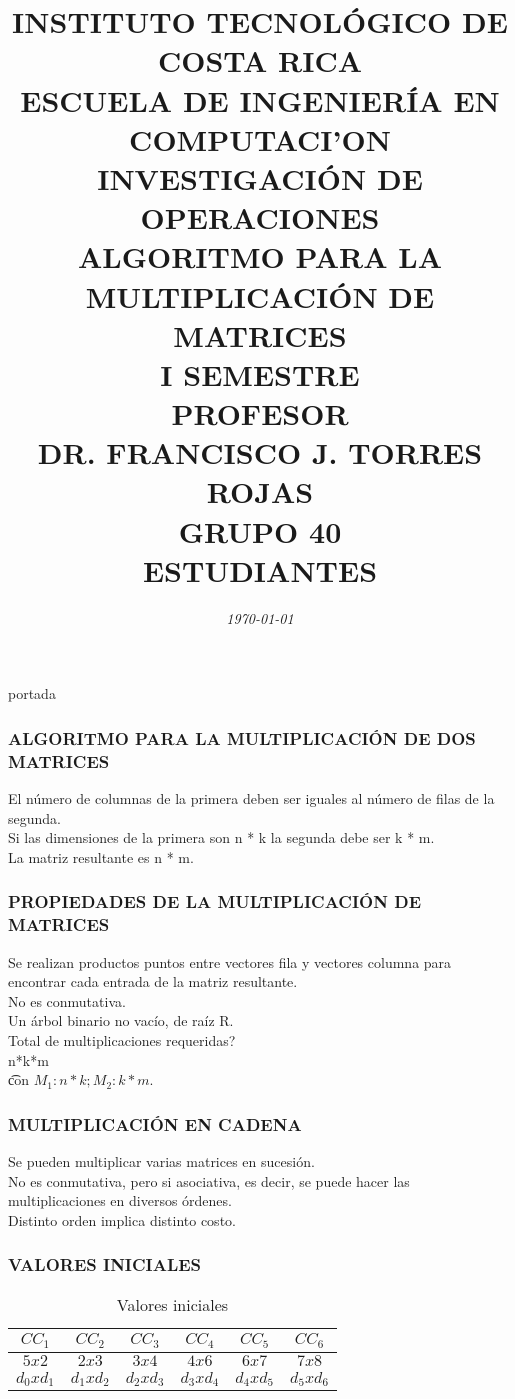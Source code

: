 \documentclass[10]{beamer}
\title{{\color{WHITE} \large \textbf{INSTITUTO TECNOL\'OGICO DE COSTA RICA}} \\ \vspace{0.02cm} 
{\color{WHITE} \large \textbf{ESCUELA DE INGENIER\'IA EN COMPUTACI'ON }} \\ \vspace{0.02cm} 
{\color{WHITE} \large \textbf{INVESTIGACI\'ON DE OPERACIONES  }} \\ \vspace{0.02cm} 
{\color{WHITE} \large \textbf{ALGORITMO PARA LA \\ MULTIPLICACI\'ON DE MATRICES  }} \\ \vspace{0.02cm} 
{\color{WHITE} \large \textbf{I SEMESTRE  }}\\ \vspace{0.02cm}
{\color{WHITE} \large \textbf{PROFESOR}} \\ \vspace{0.02cm}
{\color{WHITE} \large DR. FRANCISCO J. TORRES ROJAS  } \\ \vspace{0.02cm}
{\color{WHITE} \large \textbf{GRUPO 40}} \\ \vspace{0.01cm}
{\color{WHITE} \large \textbf{ESTUDIANTES} }}
\date{\em \color{WHITE} \today}
\begin{document}
\begin{frame}
\color{white}
\titlepage portada
\end{frame} 
\begin{frame}
\color{white}
\frametitle{ALGORITMO PARA LA MULTIPLICACI\'ON DE DOS MATRICES}
El n\'umero de columnas de la primera deben ser iguales al n\'umero de filas de la segunda.
\\ Si las dimensiones de la primera son n * k la segunda debe ser k * m.
\\ La matriz resultante es n * m.
\end{frame} 
\begin{frame}
\color{white}
\frametitle{PROPIEDADES DE LA MULTIPLICACI\'ON DE MATRICES}
Se realizan productos puntos entre vectores fila y vectores columna para encontrar cada entrada de la matriz resultante.
\\ No es conmutativa.
\\Un \'arbol binario no vac\'io, de ra\'iz R.
\\ Total de multiplicaciones requeridas? \\ n*k*m  \\ \t con $M_1:n*k; M_2: k*m$.
\end{frame} 
\begin{frame}
\color{white}
\frametitle{MULTIPLICACI\'ON EN CADENA}
Se pueden multiplicar varias matrices en sucesi\'on.
\\ No es conmutativa, pero si asociativa, es decir, se puede hacer las multiplicaciones en diversos \'ordenes.
\\ Distinto orden implica distinto costo.
\end{frame} 
\begin{frame}\frametitle{VALORES INICIALES}
 \color{white}
\begin{table}
 \begin{tabular}{ c | c  | c  | c  | c  | c }
 \\  $CC_1$ & $CC_2$   & $CC_3$   & $CC_4$   & $CC_5$   & $CC_6$  \\ 
 \hline \hline 
 $5x2$& $2x3$& $3x4$& $4x6$& $6x7$& $7x8$ \\ 
  $d_0xd_1$& $d_1xd_2$& $d_2xd_3$& $d_3xd_4$& $d_4xd_5$& $d_5xd_6$ 
 \end{tabular}
 \color{white}
\caption{Valores iniciales}
 \end{table}
 \end{frame} 
\end{document}
